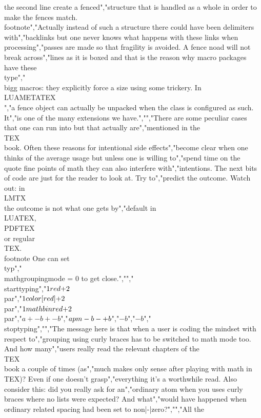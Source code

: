 the second line create a fenced","structure that is handled as a whole in order to make the fences match. \\footnote","{Actually instead of such a structure there could have been delimiters with","backlinks but one never knows what happens with these links when processing","passes are made so that fragility is avoided.} A fence noad will not break across","lines as it is boxed and that is the reason why macro packages have these \\type","{\\bigg} macros: they explicitly force a size using some trickery. In \\LUAMETATEX\\","a fence object can actually be unpacked when the class is configured as such. It","is one of the many extensions we have.","","There are some peculiar cases that one can run into but that actually are","mentioned in the \\TEX\\ book. Often these reasons for intentional side effects","become clear when one thinks of the average usage but unless one is willing to","spend time on the \\quote {fine points of math} they can also interfere with","intentions. The next bits of code are just for the reader to look at. Try to","predict the outcome. Watch out: in \\LMTX\\ the outcome is not what one gets by","default in \\LUATEX, \\PDFTEX\\ or regular \\TEX. \\footnote {One can set \\typ","{\\mathgroupingmode = 0} to get close.}","","\\starttyping","$ 1 {\\red +} 2$\\par","$ 1 \\color[red]{+} 2$\\par","$ 1 \\mathbin{\\red +} 2$\\par","$ a + - b + {- b} $","$ a \\pm - b - {+ b} $","$ - b $","$ {- b} $","\\stoptyping","","The message here is that when a user is coding the mindset with respect to","grouping using curly braces has to be switched to math mode too. And how many","users really read the relevant chapters of the \\TEX\\ book a couple of times (as","much makes only sense after playing with math in \\TEX)? Even if one doesn't grasp","everything it's a worthwhile read. Also consider this: did you really ask for an","ordinary atom when you uses curly braces where no lists were expected? And what","would have happened when ordinary related spacing had been set to non|-|zero?","","All the 